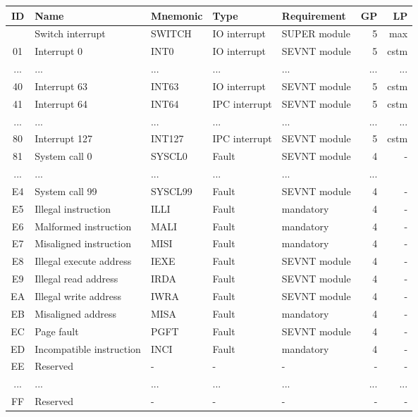 \begin{table}[hbt!] %

    \begin{center}

    \begin{tabular}{|c|l|l|l|l|r|r|}

        \hline
        ID & Name & Mnemonic & Type & Requirement & GP & LP \\
        \hline
        \addlinespace[10pt]
        \hline
        00 & Switch interrupt & SWITCH & IO interrupt & SUPER module & 5 & max \\
        \hline
        01 & Interrupt 0 & INT0 & IO interrupt & SEVNT module & 5 & cstm \\
        \hline
        ... & ... & ... & ... & ... & ... & ... \\
        \hline
        40 & Interrupt 63 & INT63 & IO interrupt & SEVNT module & 5 & cstm \\
        \hline
        41 & Interrupt 64 & INT64 & IPC interrupt & SEVNT module & 5 & cstm \\
        \hline
        ... & ... & ... & ... & ... & ... & ... \\
        \hline
        80 & Interrupt 127 & INT127 & IPC interrupt & SEVNT module & 5 & cstm \\
        \hline
        81 & System call 0 & SYSCL0 & Fault & SEVNT module & 4 & - \\
        \hline
        ... & ... & ... & ... & ... & ... \\
        \hline
        E4 & System call 99 & SYSCL99 & Fault & SEVNT module & 4 & - \\
        \hline
        E5 & Illegal instruction & ILLI & Fault & mandatory & 4 & - \\
        \hline
        E6 & Malformed instruction & MALI & Fault & mandatory & 4 & - \\
        \hline
        E7 & Misaligned instruction & MISI & Fault & mandatory & 4 & - \\
        \hline
        E8 & Illegal execute address & IEXE & Fault & SEVNT module & 4 & - \\
        \hline
        E9 & Illegal read address & IRDA & Fault & SEVNT module & 4 & - \\
        \hline
        EA & Illegal write address & IWRA & Fault & SEVNT module & 4 & - \\
        \hline
        EB & Misaligned address & MISA & Fault & mandatory & 4 & - \\
        \hline
        EC & Page fault & PGFT & Fault & SEVNT module & 4 & - \\
        \hline
        ED & Incompatible instruction & INCI & Fault & mandatory & 4 & - \\
        \hline
        EE & Reserved & - & - & - & - & - \\
        \hline
        ... & ... & ... & ... & ... & ... & ... \\
        \hline
        FF & Reserved & - & - & - & - & - \\
        \hline


\end{tabular}
\end{center}
\end{table}
